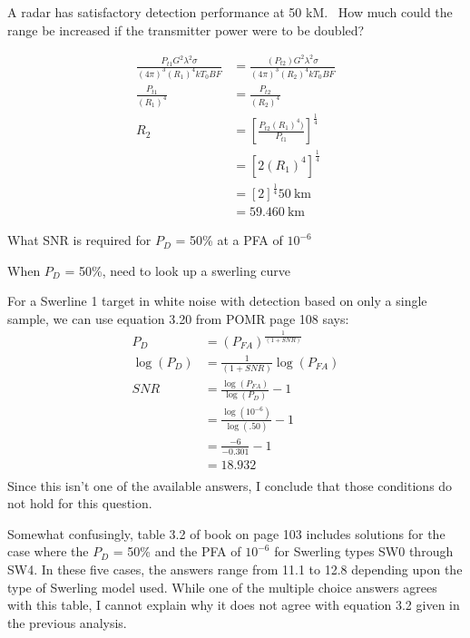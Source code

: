 \documentclass[12pt]{article}
\newenvironment{exercise}[2][Exercise]{\begin{trivlist}
    \item[\hskip \labelsep {\bfseries #1}\hskip \labelsep {\bfseries #2.}]}{\end{trivlist}}
\begin{document}
      \begin{exercise}{7}
      A radar has satisfactory detection performance at 50 kM.  How much could the range be increased if the transmitter power were to be doubled?

      \begin{align*}
      \frac{P_{t1}G^{2}\lambda^{2}\sigma}{(4\pi)^{3}(R_{1})^{4} k T_{0} B F} & = \frac{(P_{t2})G^{2}\lambda^{2}\sigma}{(4\pi)^{3}(R_{2})^{4} k T_{0} B F}\\
      \frac{P_{t1}}{(R_{1})^{4}} & = \frac{P_{t2}}{(R_{2})^{4}}\\
      R_{2} & = \left[\frac{P_{t2}(R_{1})^{4})}{P_{t1}}\right]^{\frac{1}{4}} \\
      & = \left[2(R_{1})^{4}\right]^{\frac{1}{4}}\\
      & = \left[2\right]^{\frac{1}{4}}\SI{50}{\km}\\
      & = \SI{59.460}{\km}
      \end{align*}
      \end{exercise}
      
      \begin{exercise}{8}
      What SNR is required for $P_{D}$ = 50\% at a PFA of $10^{-6}$

      When $P_{D}$ = 50\%, need to look up a swerling curve

      For a Swerline 1 target in white noise with detection based on only a single sample, we can use equation 3.20 from POMR page 108 says:
%
      \begin{align*}
      P_{D} & = (P_{FA}) ^ {\frac {1} { (1+SNR)} }\\
      \log{(P_{D})} & = \frac {1} { (1+SNR)} \log{(P_{FA})}\\
      SNR & = \frac{ \log{( P_{FA} )} } { \log{(P_{D})} } - 1\\
      & = \frac{ \log{( 10^{-6} )} } { \log{(.50)} } - 1\\
      & = \frac{-6}{-0.301} - 1\\
      & = 18.932\\
      \end{align*}
      Since this isn't one of the available answers, I conclude that those conditions do not hold for this question. 

      Somewhat confusingly, table 3.2 of book on page 103 includes solutions for the case where the $P_{D}$ = 50\% and the PFA of $10^{-6}$ for Swerling types SW0 through SW4.  In these five cases, the answers range from 11.1 to 12.8 depending upon the type of Swerling model used.  While one of the multiple choice answers agrees with this table, I cannot explain why it does not agree with equation 3.2 given in the previous analysis. 

      \end{exercise}
\end{document}
